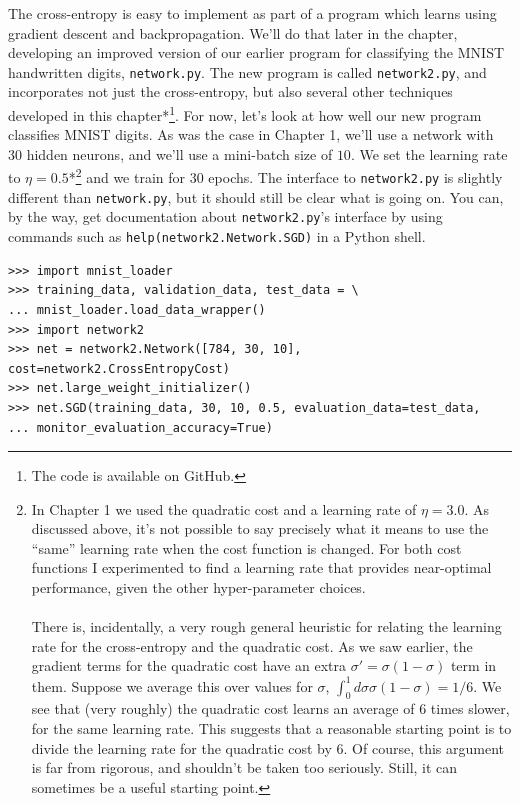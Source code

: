 The cross-entropy is easy to implement as part of a program which learns using gradient descent and backpropagation. We'll do that later in the chapter, developing an improved version of our earlier program for classifying the MNIST handwritten digits, \texttt{network.py}. The new program is called \texttt{network2.py}, and incorporates not just the cross-entropy, but also several other techniques developed in this chapter*\footnote{The code is available on GitHub.}. For now, let's look at how well our new program classifies MNIST digits. As was the case in Chapter 1, we'll use a network with $30$ hidden neurons, and we'll use a mini-batch size of $10$. We set the learning rate to $\eta = 0.5$*\footnote{In Chapter 1 we used the quadratic cost and a learning rate of $\eta = 3.0$. As discussed above, it's not possible to say precisely what it means to use the ``same'' learning rate when the cost function is changed. For both cost functions I experimented to find a learning rate that provides near-optimal performance, given the other hyper-parameter choices. \\ \\ There is, incidentally, a very rough general heuristic for relating the learning rate for the cross-entropy and the quadratic cost. As we saw earlier, the gradient terms for the quadratic cost have an extra $\sigma' = \sigma(1-\sigma)$ term in them. Suppose we average this over values for $\sigma$, $\int_0^1 d\sigma \sigma(1-\sigma) = 1/6$. We see that (very roughly) the quadratic cost learns an average of $6$ times slower, for the same learning rate. This suggests that a reasonable starting point is to divide the learning rate for the quadratic cost by $6$. Of course, this argument is far from rigorous, and shouldn't be taken too seriously. Still, it can sometimes be a useful starting point.} and we train for $30$ epochs. The interface to \texttt{network2.py} is slightly different than \texttt{network.py}, but it should still be clear what is going on. You can, by the way, get documentation about \texttt{network2.py}'s interface by using commands such as \texttt{help(network2.Network.SGD)} in a Python shell.



\begin{lstlisting}
>>> import mnist_loader
>>> training_data, validation_data, test_data = \
... mnist_loader.load_data_wrapper()
>>> import network2
>>> net = network2.Network([784, 30, 10], cost=network2.CrossEntropyCost)
>>> net.large_weight_initializer()
>>> net.SGD(training_data, 30, 10, 0.5, evaluation_data=test_data,
... monitor_evaluation_accuracy=True)

\end{lstlisting}


